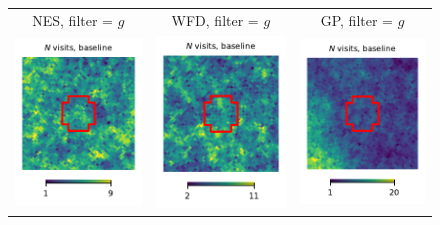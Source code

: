 \documentclass[preprintm,linenumbers]{aastex631}
\begin{document}
  	\begin{figure}
			\centering
			\begin{tabular}{  c c c}
                 NES, filter = $g$ & WFD, filter = $g$ & GP, filter = $g$ \\
				\includegraphics{results/skymaps_cutout/skymaps_cutout_first_year_one_snap_v4_0_10yrs_db_noDD_noTwi_nside-256_CountMetric_g_NES_noDD_noTwi.pdf} &
				\includegraphics{results/skymaps_cutout/skymaps_cutout_first_year_one_snap_v4_0_10yrs_db_noDD_noTwi_nside-256_CountMetric_g_WFD_noDD_noTwi.pdf} &
				\includegraphics{results/skymaps_cutout/skymaps_cutout_first_year_one_snap_v4_0_10yrs_db_noDD_noTwi_nside-256_CountMetric_g_GP_noDD_noTwi.pdf} \\

\end{tabular}
\end{figure}
\end{document}
